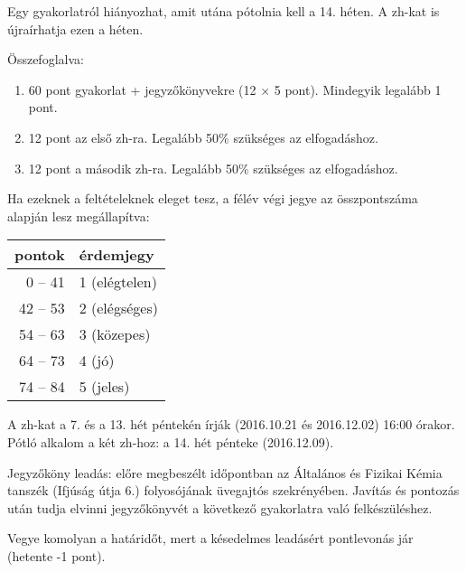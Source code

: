 \documentclass{article}
\begin{document}
Egy gyakorlatról hiányozhat, amit utána pótolnia kell a 14. héten. A zh-kat is újraírhatja ezen a héten.

Összefoglalva:

\begin{enumerate}
\item 60 pont gyakorlat + jegyzőkönyvekre (12 $\times$ 5 pont).  Mindegyik legalább 1 pont.
\item 12 pont az első zh-ra. Legalább 50\% szükséges az elfogadáshoz.
\item 12 pont a második zh-ra. Legalább 50\% szükséges az elfogadáshoz. 
\end{enumerate}

Ha ezeknek a feltételeknek eleget tesz, a félév végi jegye az összpontszáma alapján lesz megállapítva:

\begin{center}
\begin{tabular}{|r|l|}
\hline
pontok & érdemjegy \\
\hline
0 -- 41 & 1 (elégtelen) \\
\hline
42 -- 53 & 2 (elégséges) \\
\hline
54 -- 63 & 3 (közepes) \\
\hline
64 -- 73 & 4 (jó) \\
\hline
74 -- 84 & 5 (jeles) \\
\hline
\end{tabular}
\end{center}

A zh-kat a 7. és a 13. hét péntekén írják (2016.10.21 és 2016.12.02) 16:00 órakor. Pótló alkalom a két zh-hoz: a 14. hét pénteke (2016.12.09).

Jegyzőköny leadás: előre megbeszélt időpontban az Általános és Fizikai Kémia tanszék (Ifjúság útja 6.) folyosójának üvegajtós szekrényében. Javítás és pontozás után tudja elvinni jegyzőkönyvét a következő gyakorlatra való felkészüléshez.

Vegye komolyan a határidőt, mert a késedelmes leadásért pontlevonás jár (hetente -1 pont).
\end{document}
